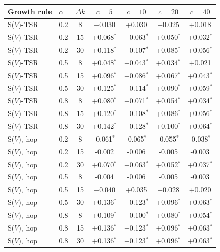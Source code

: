 \begin{tabular}{llccccc}
\toprule
Growth rule & $\alpha$ & $\Delta k$ & $c{=}5$ & $c{=}10$ & $c{=}20$ & $c{=}40$ \\
\midrule
S($V$)-TSR & 0.2 & 8 & +0.030 & +0.030 & +0.025 & +0.018 \\
S($V$)-TSR & 0.2 & 15 & +0.068$^{*}$ & +0.063$^{*}$ & +0.050$^{*}$ & +0.032$^{*}$ \\
S($V$)-TSR & 0.2 & 30 & +0.118$^{*}$ & +0.107$^{*}$ & +0.085$^{*}$ & +0.056$^{*}$ \\
S($V$)-TSR & 0.5 & 8 & +0.048$^{*}$ & +0.043$^{*}$ & +0.034$^{*}$ & +0.021 \\
S($V$)-TSR & 0.5 & 15 & +0.096$^{*}$ & +0.086$^{*}$ & +0.067$^{*}$ & +0.043$^{*}$ \\
S($V$)-TSR & 0.5 & 30 & +0.125$^{*}$ & +0.114$^{*}$ & +0.090$^{*}$ & +0.059$^{*}$ \\
S($V$)-TSR & 0.8 & 8 & +0.080$^{*}$ & +0.071$^{*}$ & +0.054$^{*}$ & +0.034$^{*}$ \\
S($V$)-TSR & 0.8 & 15 & +0.120$^{*}$ & +0.108$^{*}$ & +0.086$^{*}$ & +0.056$^{*}$ \\
S($V$)-TSR & 0.8 & 30 & +0.142$^{*}$ & +0.128$^{*}$ & +0.100$^{*}$ & +0.064$^{*}$ \\
S($V$), hop & 0.2 & 8 & -0.061$^{*}$ & -0.065$^{*}$ & -0.055$^{*}$ & -0.038$^{*}$ \\
S($V$), hop & 0.2 & 15 & -0.002 & -0.006 & -0.005 & -0.003 \\
S($V$), hop & 0.2 & 30 & +0.070$^{*}$ & +0.063$^{*}$ & +0.052$^{*}$ & +0.037$^{*}$ \\
S($V$), hop & 0.5 & 8 & -0.004 & -0.006 & -0.005 & -0.003 \\
S($V$), hop & 0.5 & 15 & +0.040 & +0.035 & +0.028 & +0.020 \\
S($V$), hop & 0.5 & 30 & +0.136$^{*}$ & +0.123$^{*}$ & +0.096$^{*}$ & +0.063$^{*}$ \\
S($V$), hop & 0.8 & 8 & +0.109$^{*}$ & +0.100$^{*}$ & +0.080$^{*}$ & +0.054$^{*}$ \\
S($V$), hop & 0.8 & 15 & +0.136$^{*}$ & +0.123$^{*}$ & +0.096$^{*}$ & +0.063$^{*}$ \\
S($V$), hop & 0.8 & 30 & +0.136$^{*}$ & +0.123$^{*}$ & +0.096$^{*}$ & +0.063$^{*}$ \\
\bottomrule
\end{tabular}
